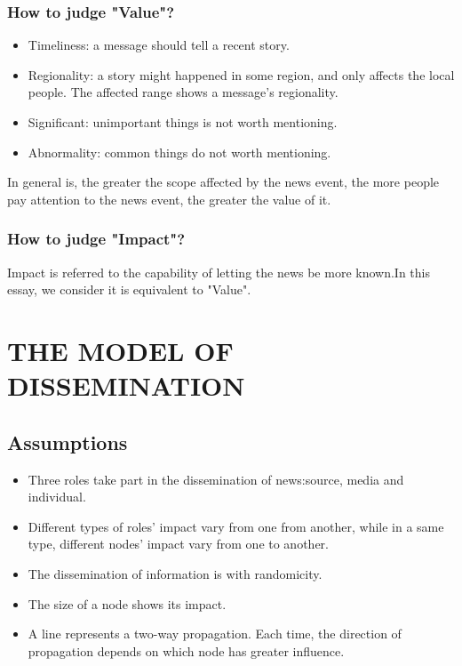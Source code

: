 \subsubsection*{How to judge "Value"?}
\begin{itemize}
	\item Timeliness: a message should tell a recent story.
	\item Regionality: a story might happened in some region, and only affects the local people. The affected range shows a message's regionality.
	\item Significant: unimportant things is not worth mentioning.
	\item Abnormality: common things do not worth mentioning.

\end{itemize}
\par In general is, the greater the scope affected by the news event, the more people pay attention to the news event, the greater the value of it.

\subsubsection*{How to judge "Impact"?}
\par Impact is referred to the capability of letting the news be more known.In this essay, we consider it is equivalent to "Value".




\section{THE MODEL OF DISSEMINATION} 
\subsection{Assumptions}
\begin{itemize}
	\item Three roles take part in the dissemination of news:source, media and individual.
	\item Different types of roles' impact vary from one from another, while in a same type, different nodes' impact vary from one to another.
	\item The dissemination of information is with randomicity.
	\item The size of a node shows its impact.
	\item A line represents a two-way propagation. Each time, the direction of propagation depends on which node has greater influence.
\end{itemize}

